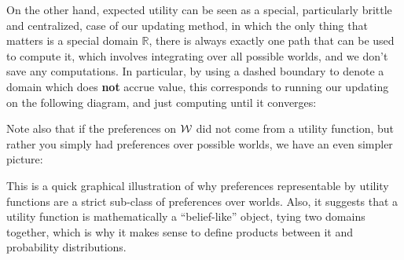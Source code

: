 \documentclass{article}
\theoremstyle{plain}
\theoremstyle{definition}
\theoremstyle{remark}
\begin{document}
	On the other hand, expected utility can be seen as a special, particularly brittle and centralized, case of our updating method, in which the only thing that matters is a special domain $\mathbb R$, there is always exactly one path that can be used to compute it, which involves integrating over all possible worlds, and we don't save any computations. In particular, by using a dashed boundary to denote a domain which does \textbf{not} accrue value, this corresponds to running our updating on the following diagram, and just computing until it converges:\\
	
	\begin{center}
	\end{center}\vspace{1em}
	
	Note also that if the preferences on $\cal W$ did not come from a utility function, but rather you simply had preferences over possible worlds, we have an even simpler picture:
	
	\begin{center}
	\end{center}\vspace{1em}
	
	This is a quick graphical illustration of why preferences representable by utility functions are a strict sub-class of preferences over worlds. Also, it suggests that a utility function is mathematically a ``belief-like'' object, tying two domains together, which is why it makes sense to define products between it and probability distributions. 
	
\end{document}
